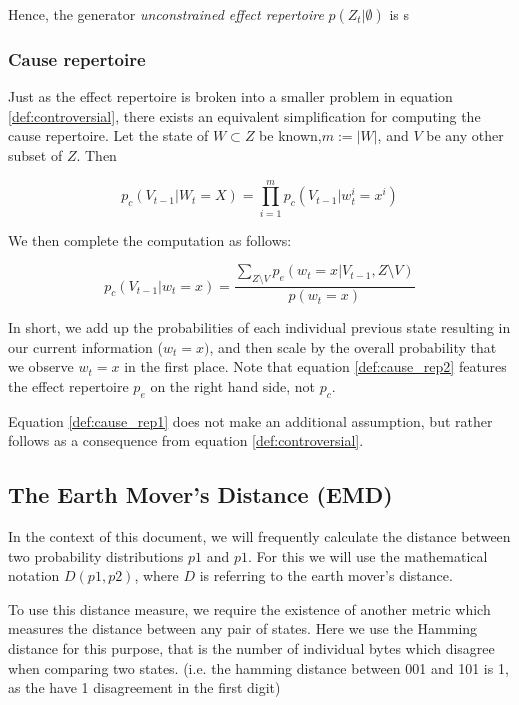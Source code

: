 Hence, the generator \textit{unconstrained effect repertoire} $p(Z_t | \emptyset)$ is s

\subsubsection{Cause repertoire}

Just as the effect repertoire is broken into a smaller problem in equation \ref{def:controversial}, there exists an equivalent simplification for computing the cause repertoire. Let the state of $W \subset Z$ be known,$m:=|W|$, and $V$ be any other subset of $Z$. Then 

\begin{equation}
\label{def:cause_rep1}
p_c(V_{t-1} | W_t=X) = \prod \limits_{i = 1}^{m} p_c(V_{t-1}|w^i_{t} = x^i)
\end{equation}

We then complete the computation as follows:

\begin{equation}
\label{def:cause_rep2}
p_c(V_{t-1}| w_t = x) = \frac{\sum \limits_{Z\setminus V} p_e(w_t = x| V_{t-1}, Z \setminus V)}{p(w_t = x)}
\end{equation}

In short, we add up the probabilities of each individual previous state resulting in our current information ($w_t = x)$, and then scale by the overall probability that we observe $w_t = x$ in the first place. Note that equation \ref{def:cause_rep2} features the effect repertoire $p_e$ on the right hand side, not $p_c$.

\begin{remark}
	Equation \ref{def:cause_rep1} does not make an additional assumption, but rather follows as a consequence from equation \ref{def:controversial}.
\end{remark}



\subsection{The Earth Mover's Distance (EMD)}
In the context of this document, we will frequently calculate the distance between two probability distributions $p1$ and $p1$. For this we will use the mathematical notation $D(p1,p2)$, where $D$ is referring to the earth mover's distance.

To use this distance measure, we require the existence of another metric which measures the distance between any pair of states. Here we use the Hamming distance for this purpose, that is the number of individual bytes which disagree when comparing two states. (i.e. the hamming distance between 001 and 101 is 1, as the have 1 disagreement in the first digit)

